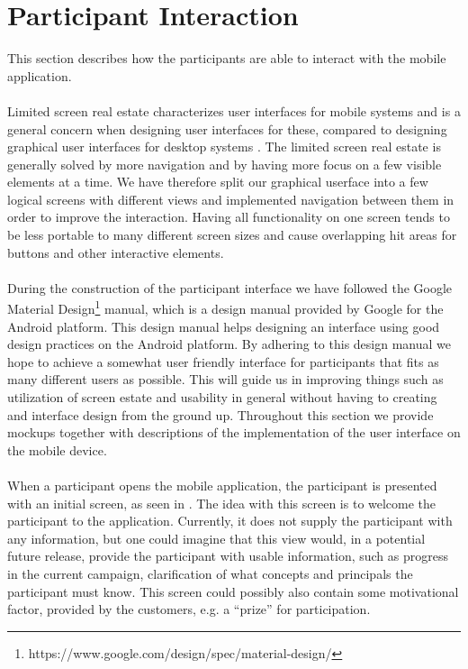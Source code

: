 
\section{Participant Interaction}
\label{sec:participant_interaction}

This section describes how the participants are able to interact with the mobile application. 
\\\\
Limited screen real estate characterizes user interfaces for mobile systems and is a general concern when designing user interfaces for these, compared to designing graphical user interfaces for desktop systems \parencite[cha. 21]{mobile_computing_constraints}. The limited screen real estate is generally solved by more navigation and by having more focus on a few visible elements at a time. We have therefore split our graphical userface into a few logical screens with different views and implemented navigation between them in order to improve the interaction. Having all functionality on one screen tends to be less portable to many different screen sizes and cause overlapping hit areas for buttons and other interactive elements.
\\\\
During the construction of the participant interface we have followed the Google Material Design\footnote{https://www.google.com/design/spec/material-design/} manual, which is a design manual provided by Google for the Android platform. This design manual helps designing an interface using good design practices on the Android platform. By adhering to this design manual we hope to achieve a somewhat user friendly interface for participants that fits as many different users as possible. This will guide us in improving things such as utilization of screen estate and usability in general without having to creating and interface design from the ground up. Throughout this section we provide mockups together with descriptions of the implementation of the user interface on the mobile device.
\\\\
When a participant opens the mobile application, the participant is presented with an initial screen, as seen in . The idea with this screen is to welcome the participant to the application. Currently, it does not supply the participant with any information, but one could imagine that this view would, in a potential future release, provide the participant with usable information, such as progress in the current campaign, clarification of what concepts and principals the participant must know. This screen could possibly also contain some motivational factor, provided by the customers, e.g. a ``prize'' for participation.

